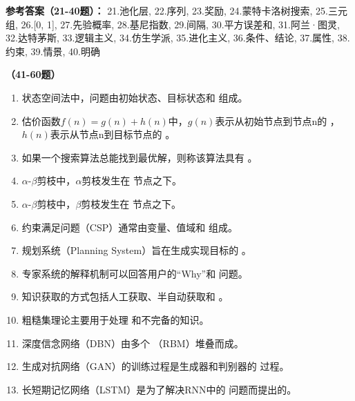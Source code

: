 \textbf{参考答案（21-40题）：}
21.池化层, 22.序列, 23.奖励, 24.蒙特卡洛树搜索, 25.三元组, 26.[0, 1], 27.先验概率, 28.基尼指数, 29.间隔, 30.平方误差和, 
31.阿兰·图灵, 32.达特茅斯, 33.逻辑主义, 34.仿生学派, 35.进化主义, 36.条件、结论, 37.属性, 38.约束, 39.情景, 40.明确

\vspace{1em}
\textbf{（41-60题）}
\begin{enumerate}[resume,leftmargin=2em,itemsep=1pt]
\item 状态空间法中，问题由初始状态、目标状态和 \underline{\hspace{3em}} 组成。
\item 估价函数$f(n) = g(n) + h(n)$中，$g(n)$表示从初始节点到节点n的 \underline{\hspace{3em}}，$h(n)$表示从节点n到目标节点的 \underline{\hspace{3em}}。
\item 如果一个搜索算法总能找到最优解，则称该算法具有 \underline{\hspace{3em}}。
\item $\alpha$-$\beta$剪枝中，$\alpha$剪枝发生在 \underline{\hspace{3em}} 节点之下。
\item $\alpha$-$\beta$剪枝中，$\beta$剪枝发生在 \underline{\hspace{3em}} 节点之下。
\item 约束满足问题（CSP）通常由变量、值域和 \underline{\hspace{3em}} 组成。
\item 规划系统（Planning System）旨在生成实现目标的 \underline{\hspace{3em}}。
\item 专家系统的解释机制可以回答用户的“Why”和 \underline{\hspace{3em}} 问题。
\item 知识获取的方式包括人工获取、半自动获取和 \underline{\hspace{3em}}。
\item 粗糙集理论主要用于处理 \underline{\hspace{3em}} 和不完备的知识。
\item 深度信念网络（DBN）由多个 \underline{\hspace{3em}}（RBM）堆叠而成。
\item 生成对抗网络（GAN）的训练过程是生成器和判别器的 \underline{\hspace{3em}} 过程。
\item 长短期记忆网络（LSTM）是为了解决RNN中的 \underline{\hspace{3em}} 问题而提出的。

\end{enumerate}
